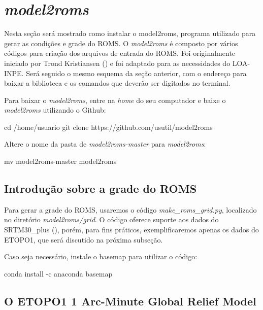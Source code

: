 \section{\textit{model2roms}}\label{model2romssec}
\bigskip

\noindent Nesta seção será mostrado como instalar o model2roms, programa utilizado para gerar as condições e grade do ROMS. O \textit{model2roms} é composto por vários códigos para criação dos arquivos de entrada do ROMS. Foi originalmente iniciado por Trond Kristiansen (\textcolor{bleu_cite}{\cite{Trond2019}}) e foi adaptado para as necessidades do LOA-INPE. Será seguido o mesmo esquema da seção anterior, com o endereço para baixar a biblioteca e os comandos que deverão ser digitados no terminal.
\bigskip

\noindent Para baixar o \textit{model2roms}, entre na \textit{home} do seu computador e baixe o \textit{model2roms} utilizando o Github:
\bigskip

\begin{bashcode}
cd /home/usuario
git clone https://github.com/usutil/model2roms
\end{bashcode}
\bigskip

\noindent Altere o nome da pasta de \textit{model2roms-master} para \textit{model2roms}:
\bigskip

\begin{bashcode}
mv model2roms-master model2roms
\end{bashcode}
\bigskip

\subsection{Introdução sobre a grade do ROMS}
\bigskip

\noindent Para gerar a grade do ROMS, usaremos o código \textit{make\_roms\_grid.py}, localizado no diretório \textit{model2roms/grid}.  O código oferece suporte aos dados do SRTM30\_plus (\cite{Becker2009}), porém, para fins práticos, exemplificaremos apenas os dados do ETOPO1, que será discutido na próxima subseção.
\bigskip

\noindent Caso seja necessário, instale o basemap para utilizar o código:
\bigskip

\begin{bashcode}
conda install -c anaconda basemap
\end{bashcode}
\bigskip

\subsection{O ETOPO1 1 Arc-Minute Global Relief Model}
\bigskip

